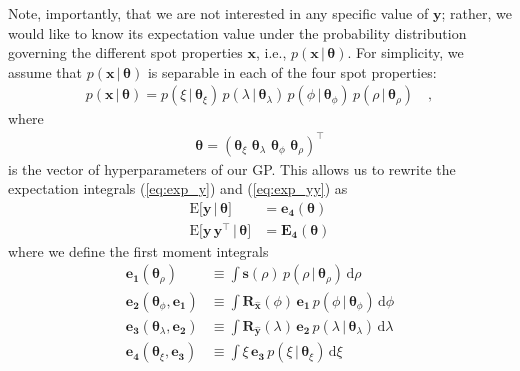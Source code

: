 Note, importantly, that we are not interested in any specific value of
$\mathbf{y}$; rather, we would like to know its expectation value under
the probability distribution governing the different spot properties $\mathbf{x}$,
i.e., $p(\mathbf{x} \, \big| \, \pmb{\theta})$.
For simplicity, we assume that $p(\mathbf{x} \, \big| \, \pmb{\theta})$
is separable in each of the four spot properties:
\begin{align}
    p(\mathbf{x} \, \big| \, \pmb{\theta})
    =
    p(\xi \, \big| \, \pmb{\theta}_{\xi}) \,
    p(\lambda \, \big| \, \pmb{\theta}_{\lambda}) \,
    p(\phi \, \big| \, \pmb{\theta}_{\phi})\,
    p(\rho \, \big| \, \pmb{\theta}_{\rho})
    \quad,
\end{align}
where
\begin{align}
    \pmb{\theta} = \left(
    \pmb{\theta}_{\xi} \, \,
    \pmb{\theta}_{\lambda} \, \,
    \pmb{\theta}_{\phi} \, \,
    \pmb{\theta}_{\rho} \right)^\top
\end{align}
is the vector of hyperparameters of our GP.
This allows us to rewrite the expectation integrals (\ref{eq:exp_y})
and (\ref{eq:exp_yy}) as
\begin{align}
    \label{eq:exp_y_sep}
    \mathrm{E} \Big[ \mathbf{y} \, \Big| \, \pmb{\theta} \Big]
     & =
    \mathbf{e_4}(\pmb{\theta})
    \\[1em]
    \label{eq:exp_yy_sep}
    \mathrm{E} \Big[ \mathbf{y} \, \mathbf{y}^\top \, \Big| \, \pmb{\theta} \Big]
     & =
    \mathbf{E_4}(\pmb{\theta})
\end{align}
where we define the first moment integrals
\begin{align}
    \label{eq:e1}
    \mathbf{e_1}(\pmb{\theta}_\rho)
     & \equiv
    \int
    \mathbf{s}(\rho) \,
    p(\rho \, \big| \, \pmb{\theta}_{\rho}) \,
    \mathrm{d}\rho
    \\[1em]
    \label{eq:e2}
    \mathbf{e_2}(\pmb{\theta}_\phi, \mathbf{e_1})
     & \equiv
    \int
    \mathbf{R}_{\hat{\mathbf{x}}}(\phi) \,
    \mathbf{e_1} \,
    p(\phi \, \big| \, \pmb{\theta}_{\phi}) \,
    \mathrm{d}\phi
    \\[1em]
    \label{eq:e3}
    \mathbf{e_3}(\pmb{\theta}_\lambda, \mathbf{e_2})
     & \equiv
    \int
    \mathbf{R}_{\hat{\mathbf{y}}}(\lambda) \,
    \mathbf{e_2} \,
    p(\lambda \, \big| \, \pmb{\theta}_{\lambda}) \,
    \mathrm{d}\lambda
    \\[1em]
    \label{eq:e4}
    \mathbf{e_4}(\pmb{\theta}_\xi, \mathbf{e_3})
     & \equiv
    \int
    \xi \,
    \mathbf{e_3} \,
    p(\xi \, \big| \, \pmb{\theta}_{\xi}) \,
    \mathrm{d}\xi
\end{align}
